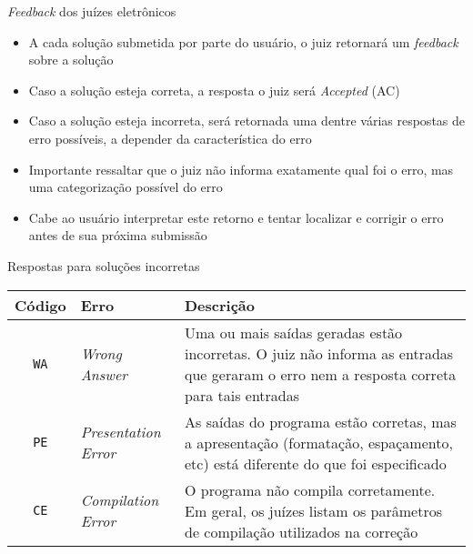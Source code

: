 \begin{frame}[fragile]{\textit{Feedback} dos juízes eletrônicos}

    \begin{itemize}
        \item A cada solução submetida por parte do usuário, o juiz retornará um \textit{feedback}
        sobre a solução
        \item Caso a solução esteja correta, a resposta o juiz será \textit{Accepted} (AC)
        \item Caso a solução esteja incorreta, será retornada uma dentre várias respostas de
        erro possíveis, a depender da característica do erro
        \item Importante ressaltar que o juiz não informa exatamente qual foi o erro, mas uma
        categorização possível do erro
        \item Cabe ao usuário interpretar este retorno e tentar localizar e corrigir o erro
        antes de sua próxima submissão
    \end{itemize}

\end{frame}

\begin{frame}[fragile]{Respostas para soluções incorretas}

    \begin{center}
        \begin{tabularx}{\textwidth}{clX}
            \toprule
            \textbf{Código} & \textbf{Erro} & \textbf{Descrição} \\
            \midrule
            \texttt{WA} & \textit{Wrong Answer} & Uma ou mais saídas geradas estão incorretas. O juiz  não informa as entradas que geraram o erro nem a resposta correta para tais entradas   \\
            \midrule
            \rowcolor[gray]{0.9}
            \texttt{PE} & \textit{Presentation Error} & As saídas do programa estão corretas, mas a apresentação (formatação,  espaçamento,  etc)  está diferente do que foi especificado \\
            \midrule
            \texttt{CE} & \textit{Compilation Error} & O programa  não  compila  corretamente.
  Em geral, os juízes listam os parâmetros de compilação utilizados na correção \\
        \bottomrule
        \end{tabularx}
    \end{center}

\end{frame}

